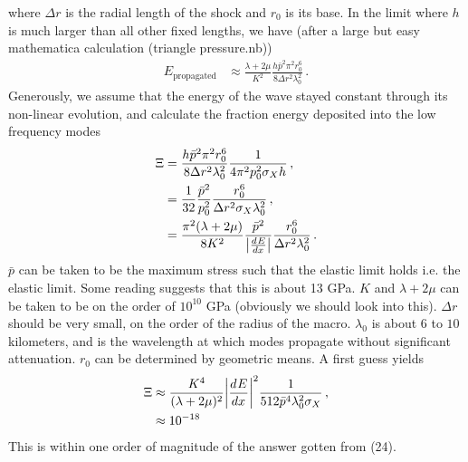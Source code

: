 \documentclass{article}
\newcommand*\te[1]{\text{#1}}
\newcommand*\f[2]{\frac{#1}{#2}}
\newcommand*\td[3]{\frac{d^{#3}#1}{d #2^{#3}}}
\begin{document}
where $\Delta r$ is the radial length of the shock and $r_0$ is its base. In the limit where $h$ is much larger than all other fixed lengths, we have (after a large but easy mathematica calculation (triangle pressure.nb))
\begin{align}
E_{\te{propagated}}&\approx \f{\lambda+2\mu}{K^2}\f{h \bar p^2\pi^2r_0^6}{8\Delta r^2\lambda_0^2}\,.
\end{align}
Generously, we assume that the energy of the wave stayed constant through its non-linear evolution, and calculate the fraction energy deposited into the low frequency modes
\begin{align}
\Xi&=\f{h \bar p^2\pi^2r_0^6}{8\Delta r^2\lambda_0^2}\f{1}{4\pi^2p_0^2\sigma_Xh}\,,\\
&=\f{1}{32}\f{\bar p^2}{p_0^2}\f{r_0^6}{\Delta r^2\sigma_X\lambda_0^2}\,,\\
&=\f{\pi^2(\lambda+2\mu)}{8K^2}\f{\bar p^2}{\abs{\td{E}{x}{}}}\f{r_0^6}{\Delta r^2\lambda_0^2}\,.
\end{align}
$\bar p$ can be taken to be the maximum stress such that the elastic limit holds i.e. the elastic limit. Some reading suggests that this is about 13 GPa. $K$ and $\lambda+2\mu$ can be taken to be on the order of $10^{10}$ GPa (obviously we should look into this). $\Delta r$ should be very small, on the order of the radius of the macro. $\lambda_0$ is about $6$ to $10$ kilometers, and is the wavelength at which modes propagate without significant attenuation. $r_0$ can be determined by geometric means. A first guess yields
\begin{align}
\Xi&\approx\f{K^4}{(\lambda+2\mu)^2}\abs{\td{E}{x}{}}^2\f{1}{512\bar p^4\lambda_0^2\sigma_X}\,,\\
&\approx10^{-18}
\end{align}
This is within one order of magnitude of the answer gotten from (24).
\end{document}
